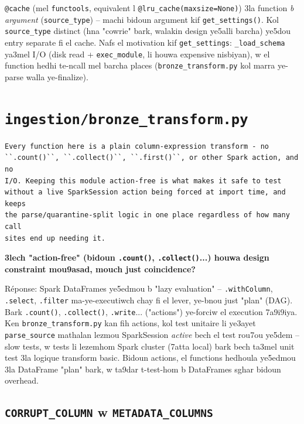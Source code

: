 \documentclass[11pt,a4paper]{report}
\DeclareRobustCommand{\code}[1]{\texttt{#1}}
\DeclareRobustCommand{\file}[1]{\texttt{\color{amber}#1}}
\begin{document}
\code{@cache} (mel \code{functools}, equivalent l \code{@lru\_cache(maxsize=None)})
3la function \emph{b argument} (\code{source\_type}) -- machi bidoun
argument kif \code{get\_settings()}. Kol \code{source\_type} distinct
(hna "cowrie" bark, walakin design ye5alli barcha) ye5dou entry separate
fi el cache. Nafs el motivation kif \code{get\_settings}: \code{\_load\_schema}
ya3mel I/O (disk read + \code{exec\_module}, li houwa expensive nisbiyan),
w el function hedhi te-ncall mel barcha places (\code{bronze\_transform.py}
kol marra ye-parse walla ye-finalize).

\section{\file{ingestion/bronze\_transform.py}}

\begin{lstlisting}[style=pystyle]
Every function here is a plain column-expression transform - no
``.count()``, ``.collect()``, ``.first()``, or other Spark action, and no
I/O. Keeping this module action-free is what makes it safe to test
without a live SparkSession action being forced at import time, and keeps
the parse/quarantine-split logic in one place regardless of how many call
sites end up needing it.
\end{lstlisting}

\begin{soual}
\textbf{3lech "action-free" (bidoun \code{.count()}, \code{.collect()}...)
houwa design constraint mou9asad, mouch just coincidence?}

Réponse: Spark DataFrames ye5edmou b "lazy evaluation" -- \code{.withColumn},
\code{.select}, \code{.filter} ma-ye-executiwch chay fi el lever, ye-bnou
just "plan" (DAG). Bark \code{.count()}, \code{.collect()}, \code{.write}...
("actions") ye-forciw el execution 7a9i9iya. Ken \code{bronze\_transform.py}
kan fih actions, kol test unitaire li ye3ayet \code{parse\_source} mathalan
lezmou SparkSession \emph{active} bech el test rou7ou ye5dem -- slow tests,
w tests li lezemhom Spark cluster (7atta local) bark bech ta3mel unit test
3la logique transform basic. Bidoun actions, el functions hedhoula ye5edmou
3la DataFrame "plan" bark, w ta9dar t-test-hom b DataFrames sghar bidoun
overhead.
\end{soual}

\subsection{\code{CORRUPT\_COLUMN} w \code{METADATA\_COLUMNS}}
\end{document}
